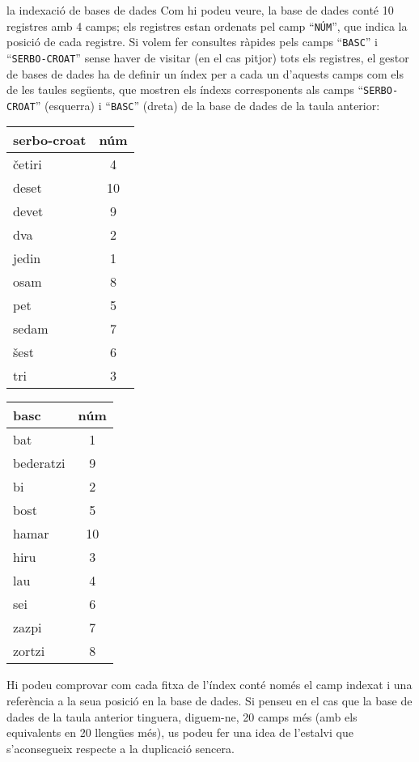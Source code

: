 \begin{persabermes}{la indexació de bases de dades}
 Com hi
  podeu veure, la base de dades conté 10 registres amb 4 camps; els
  registres estan ordenats pel camp ``\texttt{NÚM}'', que indica la
  posició de cada registre. Si volem fer consultes ràpides pels camps
  ``\texttt{BASC}'' i ``\texttt{SERBO-CROAT}'' sense haver de visitar
  (en el cas pitjor) tots els registres, el gestor de bases de dades
  ha de definir un índex per a cada un d'aquests camps com els de les
  taules següents, que mostren els índexs corresponents 
    als camps ``\texttt{SERBO-CROAT}'' (esquerra) i 
    ``\texttt{BASC}'' (dreta) de la base de dades de la
    taula anterior:
 \begin{center}
 \parbox{0.25\textwidth}{
 \begin{tabular}{lc}
 \hline
 {\sc serbo-croat} & {\sc núm} \\
 \hline
 \hline
 \v{c}etiri &     4 \\
 deset &      10 \\
 devet &      9 \\
 dva &        2 \\
 jedin &      1 \\
 osam &       8 \\
 pet &        5 \\
 sedam &      7 \\
 \v{s}est &       6 \\
 tri &        3 \\
 \hline
 \end{tabular}}%
\hspace{0.2\textwidth}%
\parbox{0.25\textwidth}{
   \begin{tabular}{lc}
   \hline
   {\sc basc\phantom{o-croat}} & {\sc núm} \\
   \hline
   \hline
  bat &       1 \\
  bederatzi  & 9 \\  
  bi &        2 \\   
  bost &      5 \\   
  hamar &     10 \\   
  hiru &       3 \\   
  lau &       4 \\   
  sei &        6 \\    
  zazpi &      7 \\ 
  zortzi &    8 \\
   \hline
   \end{tabular}}%
  \end{center}
 Hi podeu comprovar com cada fitxa de
  l'índex conté només el camp indexat i una referència a la seua
  posició en la base de dades. Si penseu en el cas que la base de
  dades de la taula anterior tinguera, diguem-ne, 20 camps més
  (amb els equivalents en 20 llengües més), us podeu fer una idea de
  l'estalvi que s'aconsegueix respecte a la duplicació sencera.


\end{persabermes}
